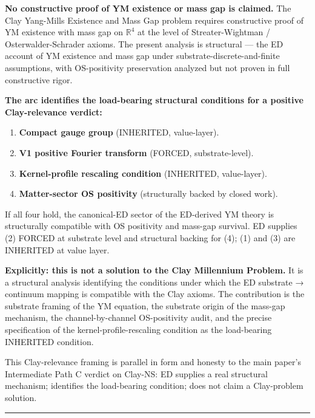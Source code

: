 \documentclass[
  11pt,a4paper]{article}
\providecommand{\tightlist}{%
  \setlength{\itemsep}{0pt}\setlength{\parskip}{0pt}}
\begin{document}
\textbf{No constructive proof of YM existence or mass gap is claimed.}
The Clay Yang-Mills Existence and Mass Gap problem requires constructive
proof of YM existence with mass gap on \(\mathbb{R}^4\) at the level of
Streater-Wightman / Osterwalder-Schrader axioms. The present analysis is
structural --- the ED account of YM existence and mass gap under
substrate-discrete-and-finite assumptions, with OS-positivity
preservation analyzed but not proven in full constructive rigor.

\textbf{The arc identifies the load-bearing structural conditions for a
positive Clay-relevance verdict:}

\begin{enumerate}
\def\labelenumi{\arabic{enumi}.}
\tightlist
\item
  \textbf{Compact gauge group} (INHERITED, value-layer).
\item
  \textbf{V1 positive Fourier transform} (FORCED, substrate-level).
\item
  \textbf{Kernel-profile rescaling condition} (INHERITED, value-layer).
\item
  \textbf{Matter-sector OS positivity} (structurally backed by closed
  work).
\end{enumerate}

If all four hold, the canonical-ED sector of the ED-derived YM theory is
structurally compatible with OS positivity and mass-gap survival. ED
supplies (2) FORCED at substrate level and structural backing for (4);
(1) and (3) are INHERITED at value layer.

\textbf{Explicitly: this is not a solution to the Clay Millennium
Problem.} It is a structural analysis identifying the conditions under
which the ED substrate → continuum mapping is compatible with the Clay
axioms. The contribution is the substrate framing of the YM equation,
the substrate origin of the mass-gap mechanism, the channel-by-channel
OS-positivity audit, and the precise specification of the
kernel-profile-rescaling condition as the load-bearing INHERITED
condition.

This Clay-relevance framing is parallel in form and honesty to the main
paper's Intermediate Path C verdict on Clay-NS: ED supplies a real
structural mechanism; identifies the load-bearing condition; does not
claim a Clay-problem solution.

\begin{center}\rule{0.5\linewidth}{0.5pt}\end{center}
\end{document}
